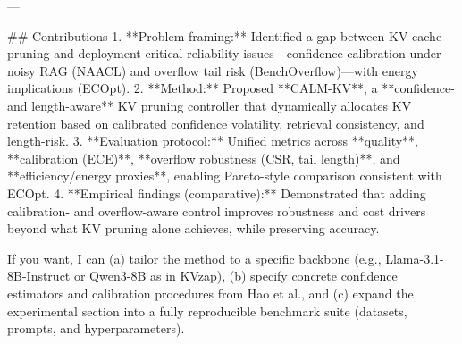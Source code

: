 ---

## Contributions  
1. **Problem framing:** Identified a gap between KV cache pruning and deployment-critical reliability issues—confidence calibration under noisy RAG (NAACL) and overflow tail risk (BenchOverflow)—with energy implications (ECOpt).  
2. **Method:** Proposed **CALM-KV**, a **confidence- and length-aware** KV pruning controller that dynamically allocates KV retention based on calibrated confidence volatility, retrieval consistency, and length-risk.  
3. **Evaluation protocol:** Unified metrics across **quality**, **calibration (ECE)**, **overflow robustness (CSR, tail length)**, and **efficiency/energy proxies**, enabling Pareto-style comparison consistent with ECOpt.  
4. **Empirical findings (comparative):** Demonstrated that adding calibration- and overflow-aware control improves robustness and cost drivers beyond what KV pruning alone achieves, while preserving accuracy.

If you want, I can (a) tailor the method to a specific backbone (e.g., Llama-3.1-8B-Instruct or Qwen3-8B as in KVzap), (b) specify concrete confidence estimators and calibration procedures from Hao et al., and (c) expand the experimental section into a fully reproducible benchmark suite (datasets, prompts, and hyperparameters).